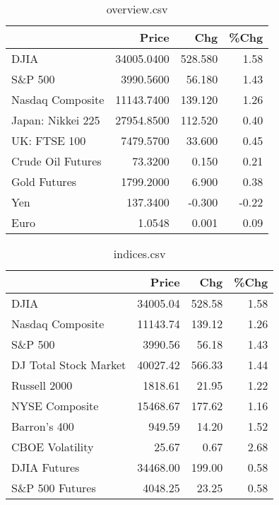 \documentclass{article}%
\begin{document}
\begin{table}[htbp]%
\caption{overview.csv}%
\centering%
\begin{adjustbox}{width=1\textwidth}%
\begin{tabular}{lrrr}
\toprule
                  &      Price &     Chg &  \%Chg \\
\midrule
             DJIA & 34005.0400 & 528.580 &  1.58 \\
          S\&P 500 &  3990.5600 &  56.180 &  1.43 \\
 Nasdaq Composite & 11143.7400 & 139.120 &  1.26 \\
Japan: Nikkei 225 & 27954.8500 & 112.520 &  0.40 \\
     UK: FTSE 100 &  7479.5700 &  33.600 &  0.45 \\
Crude Oil Futures &    73.3200 &   0.150 &  0.21 \\
     Gold Futures &  1799.2000 &   6.900 &  0.38 \\
              Yen &   137.3400 &  -0.300 & -0.22 \\
             Euro &     1.0548 &   0.001 &  0.09 \\
\bottomrule
\end{tabular}
%
\end{adjustbox}%
\end{table}

%


\begin{table}[htbp]%
\caption{indices.csv}%
\centering%
\begin{adjustbox}{width=1\textwidth}%
\begin{tabular}{lrrr}
\toprule
                      &    Price &    Chg &  \%Chg \\
\midrule
                 DJIA & 34005.04 & 528.58 &  1.58 \\
     Nasdaq Composite & 11143.74 & 139.12 &  1.26 \\
              S\&P 500 &  3990.56 &  56.18 &  1.43 \\
DJ Total Stock Market & 40027.42 & 566.33 &  1.44 \\
         Russell 2000 &  1818.61 &  21.95 &  1.22 \\
       NYSE Composite & 15468.67 & 177.62 &  1.16 \\
         Barron's 400 &   949.59 &  14.20 &  1.52 \\
      CBOE Volatility &    25.67 &   0.67 &  2.68 \\
         DJIA Futures & 34468.00 & 199.00 &  0.58 \\
      S\&P 500 Futures &  4048.25 &  23.25 &  0.58 \\
\bottomrule
\end{tabular}
%
\end{adjustbox}%
\end{table}
\end{document}
